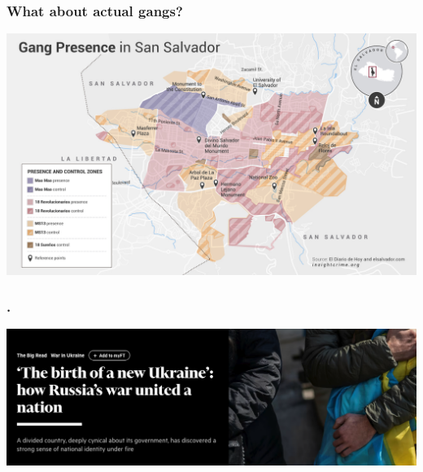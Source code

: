 \documentclass[utf8, xcolor=dvipsnames, handout]{beamer}
\begin{document}
\begin{frame}
\frametitle{What about actual gangs?}
\centering

\includegraphics[width = \textwidth]{img/gangs_salvador}

\end{frame}


\begin{frame}
\frametitle{.}
\centering

\includegraphics[width = \textwidth]{img/ft}

\end{frame}
\end{document}
